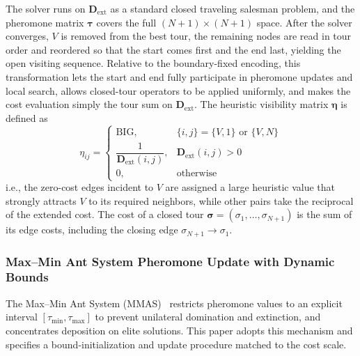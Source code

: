 The solver runs on $\mathbf{D}_{\mathrm{ext}}$ as a standard closed traveling salesman problem, and the pheromone matrix $\bm{\tau}$ covers the full $(N+1)\times(N+1)$ space. After the solver converges, $V$ is removed from the best tour, the remaining nodes are read in tour order and reordered so that the start comes first and the end last, yielding the open visiting sequence. Relative to the boundary-fixed encoding, this transformation lets the start and end fully participate in pheromone updates and local search, allows closed-tour operators to be applied uniformly, and makes the cost evaluation simply the tour sum on $\mathbf{D}_{\mathrm{ext}}$. The heuristic visibility matrix $\bm{\eta}$ is defined as
\begin{equation}
\eta_{ij} =
\begin{cases}
\mathrm{BIG}, & \{i, j\} = \{V, 1\} \text{ or } \{V, N\} \\
\dfrac{1}{\mathbf{D}_{\mathrm{ext}}(i,j)}, & \mathbf{D}_{\mathrm{ext}}(i,j) > 0 \\
0, & \text{otherwise}
\end{cases}
\label{eq:eta}
\end{equation}
i.e., the zero-cost edges incident to $V$ are assigned a large heuristic value that strongly attracts $V$ to its required neighbors, while other pairs take the reciprocal of the extended cost. The cost of a closed tour $\bm{\sigma} = (\sigma_1, \dots, \sigma_{N+1})$ is the sum of its edge costs, including the closing edge $\sigma_{N+1} \to \sigma_1$.

\subsubsection{Max--Min Ant System Pheromone Update with Dynamic Bounds}

The Max--Min Ant System (MMAS)~\textcolor{blue}{\cite{ref23}} restricts pheromone values to an explicit interval $[\tau_{\min}, \tau_{\max}]$ to prevent unilateral domination and extinction, and concentrates deposition on elite solutions. This paper adopts this mechanism and specifies a bound-initialization and update procedure matched to the cost scale.

